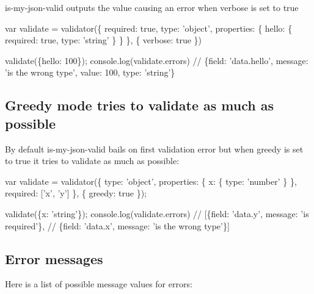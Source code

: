 is-\/my-\/json-\/valid outputs the value causing an error when verbose is set to true


\begin{DoxyCode}
var validate = validator(\{
  required: true,
  type: 'object',
  properties: \{
    hello: \{
      required: true,
      type: 'string'
    \}
  \}
\}, \{
  verbose: true
\})

validate(\{hello: 100\});
console.log(validate.errors) // \{field: 'data.hello', message: 'is the wrong type', value: 100, type:
       'string'\}
\end{DoxyCode}


\subsection*{Greedy mode tries to validate as much as possible}

By default is-\/my-\/json-\/valid bails on first validation error but when greedy is set to true it tries to validate as much as possible\+:


\begin{DoxyCode}
var validate = validator(\{
  type: 'object',
  properties: \{
    x: \{
      type: 'number'
    \}
  \},
  required: ['x', 'y']
\}, \{
  greedy: true
\});

validate(\{x: 'string'\});
console.log(validate.errors) // [\{field: 'data.y', message: 'is required'\},
                             //  \{field: 'data.x', message: 'is the wrong type'\}]
\end{DoxyCode}


\subsection*{Error messages}

Here is a list of possible {\ttfamily message} values for errors\+:


